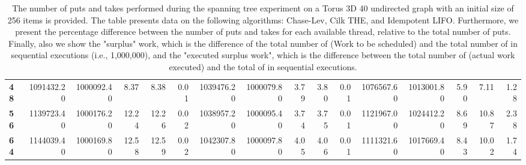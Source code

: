 \begin{table}[!ht]
{\begin{tabular}{lrrrrrrrrrrrrrrr}
\textbf{48} & 1091432.20 & 1000092.40 &           8.37 &        8.38 &                 0.01 & 1039476.20 & 1000079.80 &           3.79 &        3.80 &                 0.01 &      1076567.60 & 1013001.80 &           5.90 &        7.11 &                 1.28 \\
\textbf{56} & 1139723.40 & 1000176.20 &          12.24 &       12.26 &                 0.02 & 1038957.20 & 1000095.40 &           3.74 &        3.75 &                 0.01 &      1121967.00 & 1024412.20 &           8.69 &       10.87 &                 2.38 \\
\textbf{64} & 1144039.40 & 1000169.80 &          12.58 &       12.59 &                 0.02 & 1042307.80 & 1000097.80 &           4.05 &        4.06 &                 0.01 &      1111321.60 & 1017669.40 &           8.43 &       10.02 &                 1.74 \\
\bottomrule
\end{tabular}}
\label{difference-Torus_3D_40_undirected-256-CHASELEV-CILK-IDEMPOTENT_LIFO}
\caption{The number of puts and takes performed during the
    spanning tree experiment on a Torus 3D 40 undirected graph with an initial size
    of 256 items is provided. The table presents data on the
    following algorithms: Chase-Lev, Cilk THE, and
    Idempotent LIFO. Furthermore, we present the percentage difference
    between the number of puts and takes for each available thread,
    relative to the total number of puts. Finally, also we show the
    "surplus" work, which is the difference of the total number of
    \Puts (Work to be scheduled) and the total number of \Puts in
    sequential executions (i.e., 1,000,000), and the "executed surplus
    work", which is the difference between the total number of \Takes
    (actual work executed) and the total of \Takes in sequential
    executions.}
\end{table}
